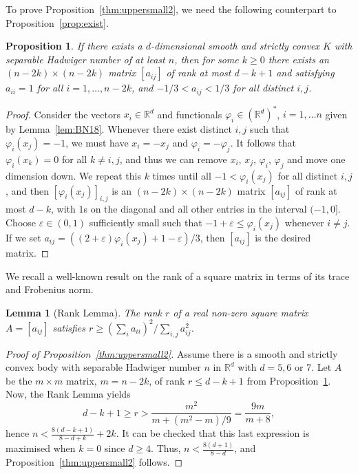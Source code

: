 \documentclass[a4paper,12pt]{article}
\theoremstyle{plain}
\newtheorem{lemma}[theorem]{Lemma}
\newtheorem{proposition}[theorem]{Proposition}
\theoremstyle{definition}
\newcommand{\epsi}{\varepsilon}
\newcommand{\fhi}{\varphi}
\newcommand{\numbersystem}[1]{\mathbb{#1}}
\newcommand{\bR}{\numbersystem{R}}
\newcommand{\Red}{\bR^d}
\begin{document}
To prove Proposition~\ref{thm:uppersmall2}, we need the following counterpart to Proposition~\ref{prop:exist}.
\begin{proposition}\label{prop:exist2}
If there exists a $d$-dimensional smooth and strictly convex $K$ with separable Hadwiger number of at least $n$, then for some $k\geq 0$ there exists an $(n-2k)\times (n-2k)$ matrix $[a_{ij}]$ of rank at most $d-k+1$ and satisfying $a_{ii}=1$ for all $i=1,\dots,n-2k$, and $-1/3 < a_{ij} < 1/3$ for all distinct $i,j$.
\end{proposition}
\begin{proof}
Consider the vectors $x_i\in\bR^d$ and functionals $\fhi_i\in(\bR^d)^*$, $i=1,\dots n$ given by Lemma~\ref{lem:BN18}.
Whenever there exist distinct $i,j$ such that $\fhi_i(x_j)=-1$, we must have $x_i=-x_j$ and $\fhi_i=-\fhi_j$.
It follows that $\fhi_i(x_k)=0$ for all $k\neq i,j$, and thus we can remove $x_i$, $x_j$, $\fhi_i$, $\fhi_j$ and move one dimension down.
We repeat this $k$ times until all $-1<\fhi_i(x_j)$ for all distinct $i,j$, and then $[\fhi_i(x_j)]_{i,j}$ is an $(n-2k)\times (n-2k)$ matrix $[a_{ij}]$ of rank at most $d-k$, with $1$s on the diagonal and all other entries in the interval $(-1,0]$.
Choose $\epsi\in(0,1)$ sufficiently small such that $-1+\epsi\leq \fhi_i(x_j)$ whenever $i\neq j$.
If we set $a_{ij}=((2+\epsi)\fhi_i(x_j)+1-\epsi)/3$, then $[a_{ij}]$ is the desired matrix.
\end{proof}

We recall a well-known result on the rank of a square matrix in terms of its trace and Frobenius norm.
\begin{lemma}[Rank Lemma]
The rank $r$ of a real non-zero square matrix $A=[a_{ij}]$ satisfies $r\geq (\sum_{i}a_{ii})^2/\sum_{i,j}a_{ij}^2$.
\end{lemma}

\begin{proof}[Proof of Proposition~\ref{thm:uppersmall2}]
 Assume there is a smooth and strictly convex body with separable Hadwiger number $n$ in $\Red$ with $d=5,6$ or 7. Let $A$ be the $m\times m$ matrix, $m=n-2k$, of rank $r\leq d-k+1$ from Proposition~\ref{prop:exist2}.
Now, the Rank Lemma yields
 \[
  d-k+1\geq r > \frac{m^2}{m+(m^2-m)/9}=\frac{9m}{m+8},
 \]
hence $n < \frac{8(d-k+1)}{8-d+k}+2k$.
It can be checked that this last expression is maximised when $k=0$ since $d\geq 4$.
Thus, $n < \frac{8(d+1)}{8-d}$, and Proposition~\ref{thm:uppersmall2} follows.
\end{proof}
\end{document}
